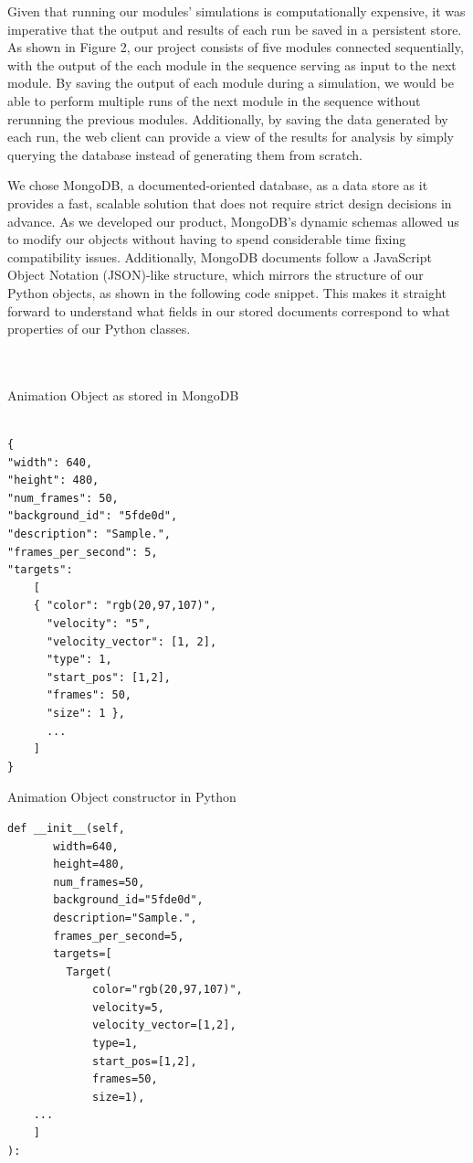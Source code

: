 \documentclass[a4paper,11pt]{article}
\begin{document}
Given that running our modules' simulations is computationally expensive, it was imperative that the output and results of each run be saved in a persistent store. As shown in Figure 2, our project consists of five modules connected sequentially, with the output of the each module in the sequence serving as input to the next module. By saving the output of each module during a simulation, we would be able to perform multiple runs of the next module in the sequence without rerunning the previous modules. Additionally, by saving the data generated by each run, the web client can provide a view of the results for analysis by simply querying the database instead of generating them from scratch.

We chose MongoDB, a documented-oriented database, as a data store as it provides a fast, scalable solution that does not require strict design decisions in advance. As we developed our product, MongoDB's dynamic schemas allowed us to modify our objects without having to spend considerable time fixing compatibility issues. Additionally, MongoDB documents follow a JavaScript Object Notation (JSON)-like structure, which mirrors the structure of our Python objects, as shown in the following code snippet. This makes it straight forward to understand what fields in our stored documents correspond to what properties of our Python classes.\\
\\
\\
\begin{minipage}[t]{0.5\textwidth}
\centering  
Animation Object as stored in MongoDB
\begin{verbatim}
  
{
"width": 640,
"height": 480,
"num_frames": 50,
"background_id": "5fde0d",
"description": "Sample.",
"frames_per_second": 5,
"targets":
	[
	{ "color": "rgb(20,97,107)",
	  "velocity": "5",
	  "velocity_vector": [1, 2],
	  "type": 1,
	  "start_pos": [1,2],
	  "frames": 50,
	  "size": 1 },
	  ...
	]
}
\end{verbatim}
\end{minipage} 
\begin{minipage}[t]{0.5\textwidth}
\centering  
Animation Object constructor in Python
\begin{verbatim}	
def __init__(self,
  	   width=640,
  	   height=480,    
  	   num_frames=50,
  	   background_id="5fde0d",
  	   description="Sample.",
  	   frames_per_second=5,
  	   targets=[
  	     Target(
	         color="rgb(20,97,107)",
	         velocity=5,
	         velocity_vector=[1,2],
	         type=1,
	         start_pos=[1,2],
	         frames=50,
	         size=1),
	...
	]
):
\end{verbatim}
\end{minipage}
\end{document}

